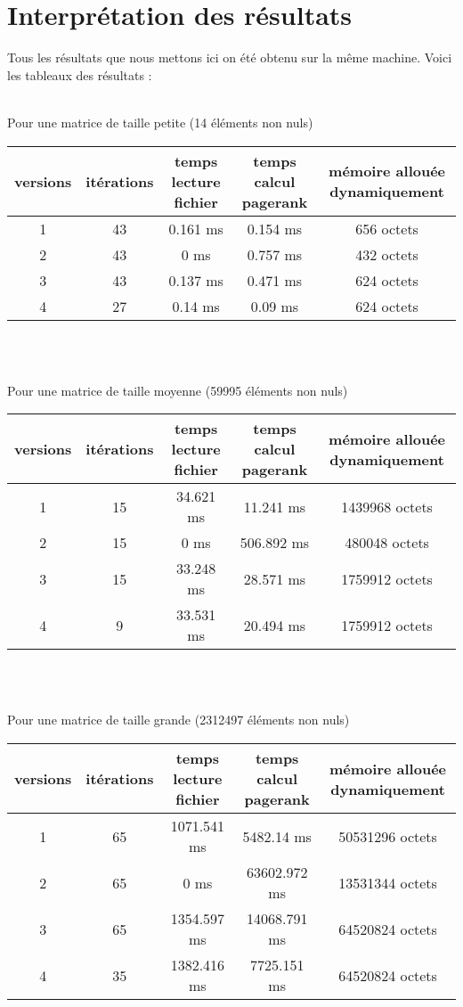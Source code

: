 \documentclass[10pt,a4paper]{article}
\begin{document}
\section{Interprétation des résultats}
Tous les résultats que nous mettons ici on été obtenu sur la même machine. Voici les tableaux des résultats :
\\
\\
\begin{center}
Pour une matrice de taille petite (14 éléments non nuls)
\end{center}
\begin{tabular}{| c | c | c | c | c |}
\hline
versions & itérations & temps lecture fichier & temps calcul pagerank & mémoire allouée dynamiquement \\
\hline
1 & 43 & 0.161 ms & 0.154 ms & 656 octets \\
2 & 43 & 0 ms & 0.757 ms & 432 octets\\
3 & 43 & 0.137 ms & 0.471 ms & 624 octets\\
4 & 27 & 0.14 ms & 0.09 ms & 624 octets\\
\hline	
\end{tabular}
\\
\\
\begin{center}
Pour une matrice de taille moyenne (59995 éléments non nuls)
\end{center}
\begin{tabular}{| c | c | c | c | c |}
\hline
versions & itérations & temps lecture fichier & temps calcul pagerank & mémoire allouée dynamiquement \\
\hline
1 & 15 & 34.621 ms & 11.241 ms & 1439968 octets \\
2 & 15 & 0 ms & 506.892 ms & 480048 octets\\
3 & 15 & 33.248 ms & 28.571 ms & 1759912 octets\\
4 & 9 & 33.531 ms & 20.494 ms & 1759912 octets\\
\hline	
\end{tabular}
\\
\\
\begin{center}
Pour une matrice de taille grande (2312497 éléments non nuls)
\end{center}
\begin{tabular}{| c | c | c | c | c |}
\hline
versions & itérations & temps lecture fichier & temps calcul pagerank & mémoire allouée dynamiquement \\
\hline
1 & 65 & 1071.541 ms & 5482.14 ms & 50531296 octets \\
2 & 65 & 0 ms & 63602.972 ms & 13531344 octets\\
3 & 65 & 1354.597 ms & 14068.791 ms & 64520824 octets\\
4 & 35 & 1382.416 ms & 7725.151 ms &  64520824 octets\\
\hline	
\end{tabular}
\\
\\
\end{document}
